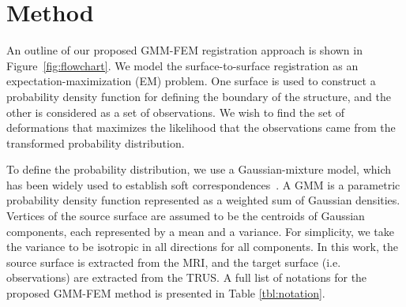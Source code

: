 \documentclass[journal]{IEEEtran}
\begin{document}
\section{Method}
An outline of our proposed GMM-FEM registration approach is shown in Figure~\ref{fig:flowchart}. We model the surface-to-surface registration as an expectation-maximization (EM) problem.  One surface is used to construct a probability density function for defining the boundary of the structure, and the other is considered as a set of observations.  We wish to find the set of deformations that maximizes the likelihood that the observations came from the transformed probability distribution.

To define the probability distribution, we use a Gaussian-mixture model, which has been widely used to establish soft correspondences~\cite{Myronenko10a,Rasoulian12a,Jian11a}. A GMM is a parametric probability density function represented as a weighted sum of Gaussian densities.  Vertices of the source surface are assumed to be the centroids of Gaussian components, each represented by a mean and a variance. For simplicity, we take the variance to be isotropic in all directions for all components.  In this work, the source surface is extracted from the MRI, and the target surface (i.e. observations) are extracted from the TRUS.  A full list of notations for the proposed GMM-FEM method is presented in Table \ref{tbl:notation}.
\end{document}
